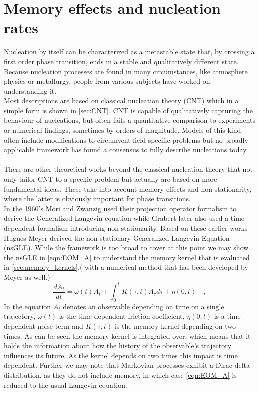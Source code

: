 \section{Memory effects and nucleation rates}
\label{sec:memory_approach}
Nucleation by itself can be characterized as a metastable state that, by crossing a first order phase transition, ends in a stable and qualitatively different state. Because nucleation processes are found in many circumstances, like atmosphere physics or metallurgy, people from various subjects have worked on understanding it.\\

Most descriptions are based on classical nucleation theory (CNT) which in a simple form is shown in \autoref{sec:CNT}. CNT is capable of qualitatively capturing the behaviour of nucleations, but often fails a quantitative comparison to experiments or numerical findings, sometimes by orders of magnitude. Models of this kind often include modifications to circumvent field specific problems but no broadly applicable framework has found a consensus to fully describe nucleations today. \\

\\

There are other theoretical works beyond the classical nucleation theory that not only tailor CNT to a specific problem but actually are based on more fundamental ideas. These take into account memory effects and non stationarity, where the latter is obviously important for phase transitions.\\

In the 1960's Mori and Zwanzig used their projection operator formalism to derive the Generalized Langevin equation while Grabert later also used a time dependent formalism introducing non stationarity. Based on these earlier works Hugues Meyer derived the non stationary Generalized Langevin Equation (nsGLE). While the framework is too broad to cover at this point we may show the nsGLE in \autoref{eqn:EOM_A} to understand the memory kernel that is evaluated in \autoref{sec:memory_kernels}.( with a numerical method that has been developed by Meyer as well.)
\begin{equation}
\label{eqn:EOM_A}
  \frac{d A_{t}}{dt} = \omega (t) A_{t} + \int_{0}^{t} K(\tau, t) A_{\tau} d\tau + \eta(0,t) \quad ,
\end{equation}
In the equation $A_{t}$ denotes an observable depending on time on a single trajectory, $\omega (t)$ is the time dependent friction coefficient, $\eta(0,t)$ is a time dependent noise term and $K(\tau, t)$ is the memory kernel depending on two times. As can be seen the memory kernel is integrated over, which means that it holds the information about how the history of the observable's trajectory influences its future. As the kernel depends on two times this impact is time dependent. Further we may note that Markovian processes exhibit a Dirac delta distribution, as they do not include memory, in which case \autoref{eqn:EOM_A} is reduced to the usual Langevin equation.\\

